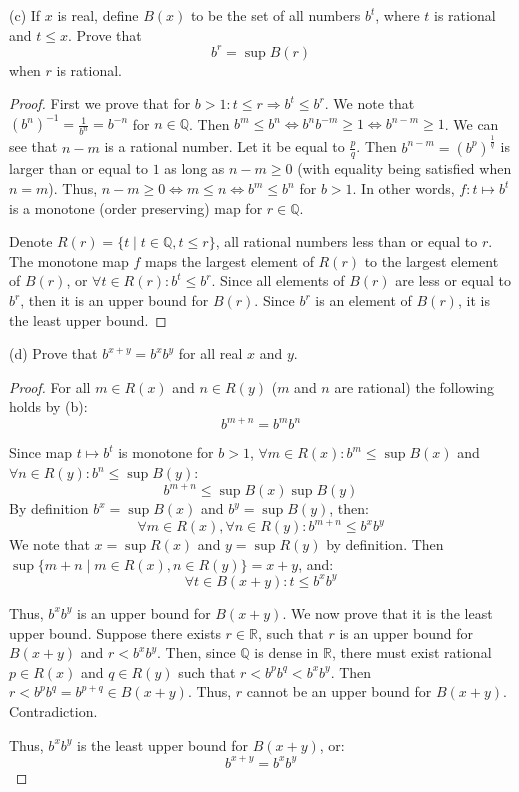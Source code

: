 \documentclass{article}
\newcommand{\R}{\mathbb{R}}
\newcommand{\Q}{\mathbb{Q}}
\begin{document}
\begin{tcolorbox}
(c) If $x$ is real, define $B(x)$ to be the set of all numbers $b^t$, where $t$ is rational and $t \leq x$.
Prove that
$$b^r = \sup B(r)$$
when $r$ is rational.
\end{tcolorbox}

\begin{proof}
First we prove that for $b>1 : t \leq r \Rightarrow b^t \leq b^r$.
We note that $(b^n)^{-1} = \frac{1}{b^n} = b^{-n}$ for $n \in \Q$.
Then $b^m \leq b^n \iff b^n b^{-m} \geq 1 \iff b^{n-m} \geq 1$.
We can see that $n-m$ is a rational number. Let it be equal to $\frac{p}{q}$.
Then $b^{n-m} = (b^p)^{\frac{1}{q}}$ is larger than or equal to $1$ as long as $n-m \geq 0$ (with equality being satisfied when $n=m$).
Thus, $n-m \geq 0 \iff m \leq n \iff b^m \leq b^n$ for $b>1$.
In other words, $f: t \mapsto b^t$ is a monotone (order preserving) map for $r \in \Q$.

Denote $R(r) = \{t \mid t \in \Q, t \leq r \}$, all rational numbers less than or equal to $r$.
The monotone map $f$ maps the largest element of $R(r)$ to the largest element of $B(r)$, or $\forall t \in R(r): b^t \leq b^r$.
Since all elements of $B(r)$ are less or equal to $b^r$, then it is an upper bound for $B(r)$.
Since $b^r$ is an element of $B(r)$, it is the least upper bound.

\end{proof}

\begin{tcolorbox}
(d) Prove that $b^{x+y} = b^x b^y$ for all real $x$ and $y$.
\end{tcolorbox}

\begin{proof}

For all $m \in R(x)$ and $n \in R(y)$ ($m$ and $n$ are rational) the following holds by (b):
\[ b^{m+n} = b^m b^n \]

Since map $t \mapsto b^t$ is monotone for $b>1$, $\forall m \in R(x) : b^m \leq \sup B(x)$ and $\forall n \in R(y) : b^n \leq \sup B(y)$:
\[ b^{m+n} \leq \sup B(x) \sup B(y) \]
By definition $b^x = \sup B(x)$ and $b^y = \sup B(y)$, then:
\[ \forall m \in R(x), \forall n \in R(y) : b^{m+n} \leq b^x b^y \]
We note that $x = \sup R(x)$ and $y = \sup R(y)$ by definition.
Then $\sup \{ m+n \mid m \in R(x), n \in R(y)\} = x+y$, and:
\[ \forall t \in B(x+y): t \leq b^x b^y \]

Thus, $b^x b^y$ is an upper bound for $B(x+y)$.
We now prove that it is the least upper bound.
Suppose there exists $r \in \R$, such that $r$ is an upper bound for $B(x+y)$ and $r < b^x b^y$.
Then, since $\Q$ is dense in $\R$, there must exist rational $p \in R(x)$ and $q \in R(y)$ such that $r < b^p b^q < b^x b^y$.
Then $r < b^p b^q = b^{p+q} \in B(x+y)$.
Thus, $r$ cannot be an upper bound for $B(x+y)$.
Contradiction.

Thus, $b^x b^y$ is the least upper bound for $B(x+y)$, or:
\[ b^{x+y} = b^x b^y \]

\end{proof}
\end{document}
